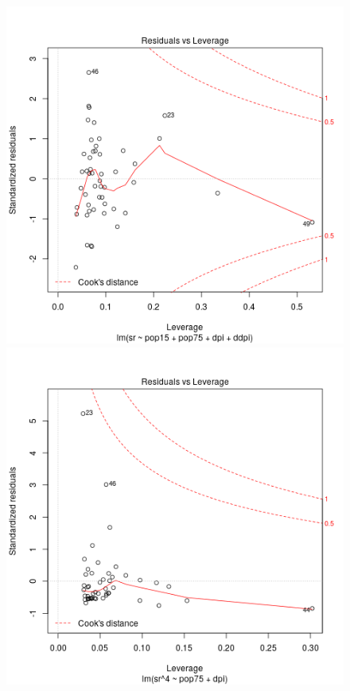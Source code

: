 \begin{figure}[p]
  \begin{center}
    \includegraphics[scale=0.48]{imgR/plot15.png} \hspace*{2cm}
	\includegraphics[scale=0.48]{imgR/plot25.png} \\

\end{center}
\end{figure}
